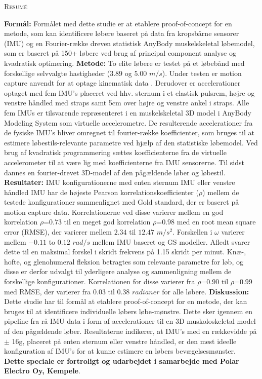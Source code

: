 \begin{titlepage}
\begin{center}
   \textsc{\LARGE Resumé}\\[1.4cm]  
\end{center}
\textbf{Formål:} Formålet med dette studie er at etablere proof-of-concept for en metode, som kan identificere løbere baseret på data fra kropsbårne sensorer (IMU) og en Fourier-række dreven statistisk AnyBody muskelskeletal løbemodel, som er baseret på 150+ løbere ved brug af principal component analyse og kvadratisk optimering. \textbf{Metode:} To elite løbere er testet på et løbebånd med forskellige selvvalgte hastigheder ($3.89$ og $5.00$ $m/s$). Under testen er motion capture anvendt for at optage kinematisk data \parencite{QualMiqus}. Derudover er accelerationer optaget med fem IMU's placeret ved hhv. sternum i et elastisk pulsrem, højre og venstre håndled med straps samt 5cm over højre og venstre ankel i straps. Alle fem IMUs er tilsvarende repræsenteret i en muskelskeletal 3D model i AnyBody Modeling System som virtuelle accelerometre. De resulterende accelerationer fra de fysiske IMU's bliver omregnet til fourier-række koefficienter, som bruges til at estimere løbestils-relevante parametre ved hjælp af den statistiske løbemodel. Ved brug af kvadratisk programmering sættes koefficienterne fra de virtuelle accelerometer til at være lig med koefficienterne fra IMU sensorerne. Til sidst dannes en fourier-drevet 3D-model af den pågældende løber og løbestil. \textbf{Resultater:} IMU konfigurationerne med enten sternum IMU eller venstre håndled IMU har de højeste Pearson korrelationskoefficienter ($\rho$) mellem de testede konfigurationer sammenlignet med Gold standard, der er baseret på motion capture data. Korrelationerne ved disse varierer mellem en god korrelation $\rho$=$0.73$ til en meget god korrelation $\rho$=$0.98$ med en root mean square error (RMSE), der varierer mellem $2.34$ til $12.47$ $m/s^2$. Forskellen i $\omega$ varierer mellem $-0.11$ to $0.12$ $rad/s$ mellem IMU baseret og GS modeller. Afledt svarer dette til en maksimal forskel i skridt frekvens på 1.15 skridt per minut.
Knæ-, hofte, og glenohumeral fleksion betragtes som relevante parametre for løb, og disse er derfor udvalgt til yderligere analyse og sammenligning mellem de forskellige konfigurationer. Korrelationen for disse varierer fra $\rho$=$0.90$ til $\rho$=$0.99$ med RMSE, der varierer fra $0.03$ til $0.38$ $radianer$ for alle løbere. \textbf{Diskussion:} Dette studie har til formål at etablere proof-of-concept for en metode, der kan bruges til at identificere individuelle løbers løbe-mønstre. Dette sker igennem en pipeline fra rå IMU data i form af accelerationer til en 3D muskoloskeletal model af den pågældende løber. Resultaterne indikerer, at IMU's med en rækkevidde på $\pm$ 16g, placeret på enten sternum eller venstre håndled, er den mest ideelle konfiguration af IMU's for at kunne estimere en løbers bevægelsesmønster.
\vspace{.25cm}\\
\textbf{Dette speciale er fortroligt og udarbejdet i samarbejde med Polar Electro Oy, Kempele}. 
\end{titlepage}
\clearpage

